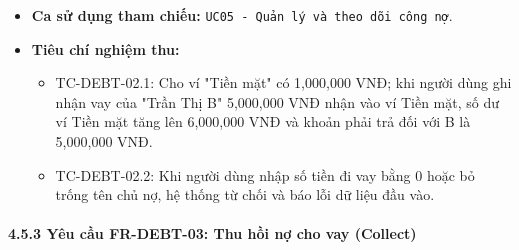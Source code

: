 \documentclass[11pt,a4paper]{article}
\providecommand{\tightlist}{
  \setlength{\itemsep}{0pt}\setlength{\parskip}{0pt}}
\begin{document}
\begin{itemize}
  \begin{itemize}
  \tightlist
  \item
    Bản ghi công nợ mới với loại nghiệp vụ \texttt{borrow} được lưu vào
    bảng \texttt{debt}.
  \item
    Số dư ví nhận tiền tăng thêm \(amount\).
  \item
    Khoản phải trả cho chủ nợ tăng tương ứng.
  \item
    Thông báo ghi nhận khoản đi vay thành công.
  \end{itemize}
\item
  \textbf{Ca sử dụng tham chiếu:}
  \texttt{UC05\ -\ Quản\ lý\ và\ theo\ dõi\ công\ nợ}.
\item
  \textbf{Tiêu chí nghiệm thu:}

  \begin{itemize}
  \tightlist
  \item
    TC-DEBT-02.1: Cho ví "Tiền mặt" có 1,000,000 VNĐ; khi người dùng ghi
    nhận vay của "Trần Thị B" 5,000,000 VNĐ nhận vào ví Tiền mặt, số dư
    ví Tiền mặt tăng lên 6,000,000 VNĐ và khoản phải trả đối với B là
    5,000,000 VNĐ.
  \item
    TC-DEBT-02.2: Khi người dùng nhập số tiền đi vay bằng 0 hoặc bỏ
    trống tên chủ nợ, hệ thống từ chối và báo lỗi dữ liệu đầu vào.
  \end{itemize}
\end{itemize}

\newpage

\paragraph{4.5.3 Yêu cầu FR-DEBT-03: Thu hồi nợ cho vay
(Collect)}\label{453-yuxeau-cux1ea7u-fr-debt-03-thu-hux1ed3i-nux1ee3-cho-vay-collect}
\end{document}

